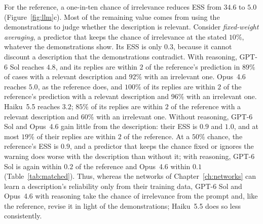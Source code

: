 For the reference, a one-in-ten chance of irrelevance reduces ESS from $34.6$ to $5.0$ (Figure~\ref{fig:llm}c). Most of the remaining value comes from using the demonstrations to judge whether the description is relevant. Consider \emph{fixed-weight averaging}, a predictor that keeps the chance of irrelevance at the stated $10\%$, whatever the demonstrations show. Its ESS is only $0.3$, because it cannot discount a description that the demonstrations contradict. With reasoning, GPT-6 Sol reaches $4.8$, and its replies are within $2$ of the reference's prediction in $89\%$ of cases with a relevant description and $92\%$ with an irrelevant one. Opus~4.6 reaches $5.0$, as the reference does, and $100\%$ of its replies are within $2$ of the reference's prediction with a relevant description and $96\%$ with an irrelevant one. Haiku~5.5 reaches $3.2$; $85\%$ of its replies are within $2$ of the reference with a relevant description and $60\%$ with an irrelevant one. Without reasoning, GPT-6 Sol and Opus~4.6 gain little from the description: their ESS is $0.9$ and $1.0$, and at most $19\%$ of their replies are within $2$ of the reference. At a $50\%$ chance, the reference's ESS is $0.9$, and a predictor that keeps the chance fixed or ignores the warning does worse with the description than without it; with reasoning, GPT-6 Sol is again within $0.2$ of the reference and Opus~4.6 within $0.1$ (Table~\ref{tab:matched}). Thus, whereas the networks of Chapter~\ref{ch:networks} can learn a description's reliability only from their training data, GPT-6 Sol and Opus~4.6 with reasoning take the chance of irrelevance from the prompt and, like the reference, revise it in light of the demonstrations; Haiku~5.5 does so less consistently.


